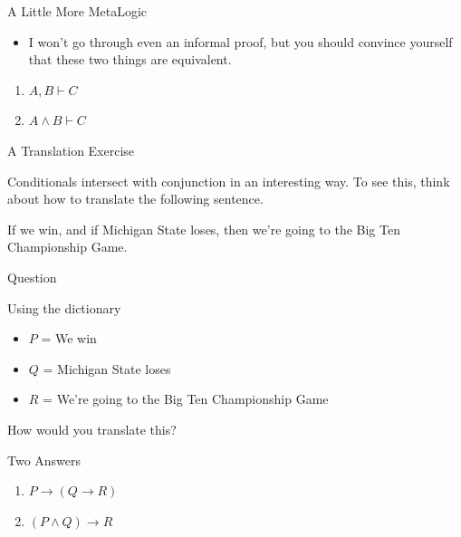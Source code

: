 \documentclass[
  ignorenonframetext,
]{beamer}
\providecommand{\tightlist}{%
  \setlength{\itemsep}{0pt}\setlength{\parskip}{0pt}}
\renewcommand{\,}{\text{, }}
\begin{document}
\begin{frame}{A Little More MetaLogic}
\protect\hypertarget{a-little-more-metalogic}{}

\begin{itemize}
\tightlist
\item
  I won't go through even an informal proof, but you should convince
  yourself that these two things are equivalent.
\end{itemize}

\begin{enumerate}
\tightlist
\item
  \(A, B \vdash C\)
\item
  \(A \wedge B \vdash C\)
\end{enumerate}

\end{frame}

\begin{frame}{A Translation Exercise}
\protect\hypertarget{a-translation-exercise}{}

Conditionals intersect with conjunction in an interesting way. To see
this, think about how to translate the following sentence.

If we win, and if Michigan State loses, then we're going to the Big Ten
Championship Game.

\end{frame}

\begin{frame}{Question}
\protect\hypertarget{question}{}

Using the dictionary

\begin{itemize}
\tightlist
\item
  \(P\) = We win
\item
  \(Q\) = Michigan State loses
\item
  \(R\) = We're going to the Big Ten Championship Game
\end{itemize}

How would you translate this?

\end{frame}

\begin{frame}{Two Answers}
\protect\hypertarget{two-answers}{}

\begin{enumerate}
\tightlist
\item
  \(P \rightarrow (Q \rightarrow R)\)
\item
  \((P \wedge Q) \rightarrow R\)
\end{enumerate}

\end{frame}
\end{document}
